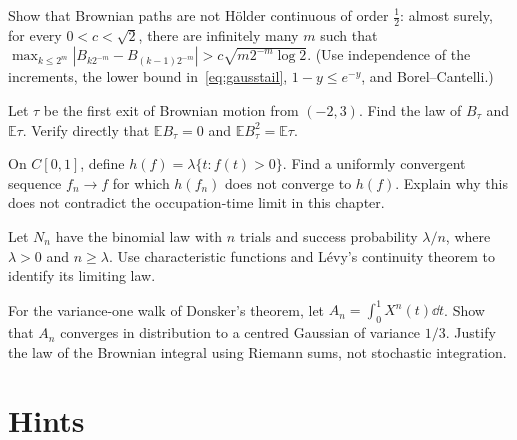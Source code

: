\begin{exercise}[$\star\star\star$]\label{ex:modulus}
Show that Brownian paths are not H\"older continuous of order $\frac12$: almost surely, for every $0<c<\sqrt2$, there are infinitely many $m$ such that
$\max_{k\le2^m}|B_{k2^{-m}}-B_{(k-1)2^{-m}}|>c\sqrt{m2^{-m}\log2}$. (Use independence of the increments, the lower bound in~\eqref{eq:gausstail}, $1-y\le e^{-y}$, and
Borel--Cantelli.)
\end{exercise}

\begin{exercise}[$\star$]\label{ex:v11-ch03-exit}
Let $\tau$ be the first exit of Brownian motion from $(-2,3)$. Find the law of $B_\tau$ and $\mathbb E\tau$. Verify directly that $\mathbb E B_\tau=0$ and $\mathbb E B_\tau^2=\mathbb E\tau$.
\end{exercise}

\begin{exercise}[$\star\star$]\label{ex:v11-ch03-discontinuity}
On $C[0,1]$, define $h(f)=\lambda\{t:f(t)>0\}$. Find a uniformly convergent sequence $f_n\to f$ for which $h(f_n)$ does not converge to $h(f)$. Explain why this does not contradict the occupation-time limit in this chapter.
\end{exercise}

\begin{exercise}[$\star\star$]\label{ex:v11-ch03-poisson}
Let $N_n$ have the binomial law with $n$ trials and success probability $\lambda/n$, where $\lambda>0$ and $n\ge\lambda$. Use characteristic functions and L\'evy's continuity theorem to identify its limiting law.
\end{exercise}

\begin{exercise}[$\star\star\star$]\label{ex:v11-ch03-area}
For the variance-one walk of Donsker's theorem, let $A_n=\int_0^1X^n(t)\dd t$. Show that $A_n$ converges in distribution to a centred Gaussian of variance $1/3$. Justify the law of the Brownian integral using Riemann sums, not stochastic integration.
\end{exercise}

\section{Hints}

